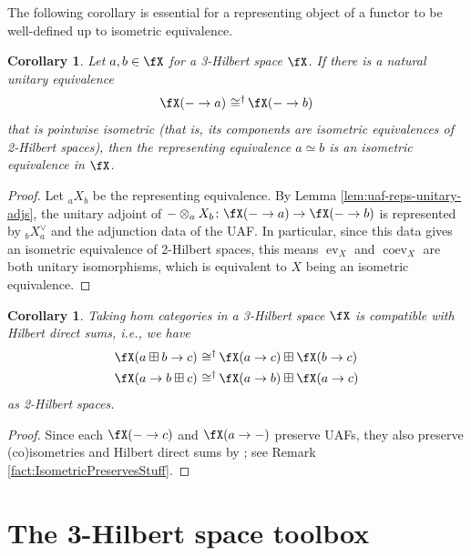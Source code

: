 \documentclass[12pt, reqno]{amsart}
\DeclareMathOperator{\coev}{coev}
\DeclareMathOperator{\ev}{ev}
\theoremstyle{plain}
\newtheorem{cor}[thm]{Corollary}
\theoremstyle{definition}
\DeclareMathOperator{\isomeq}{\mathbin{\,\cong^\dag}}
\begin{document}
The following corollary is essential for a representing object of a functor to be well-defined up to isometric equivalence.

\begin{cor}\label{cor:isometric-yoneda}
Let $a,b \in \fX$ for a 3-Hilbert space $\fX$. 
If there is a natural unitary equivalence 
$$\fX(-\to a) \isomeq \fX(-\to b)$$
that is pointwise isometric (that is, its components are isometric equivalences of 2-Hilbert spaces), then the representing equivalence $a \simeq b$ is an isometric equivalence in $\fX$.
\end{cor}
\begin{proof}
Let ${}_aX_b$ be the representing equivalence. 
By Lemma \ref{lem:uaf-reps-unitary-adjs}, the unitary adjoint of $- \otimes_a X _b \colon \fX(-\to a) \to \fX(-\to b)$ is represented by ${}_bX^\vee_a$ and the adjunction data of the UAF. 
In particular, since this data gives an isometric equivalence of 2-Hilbert spaces, this means $\ev_X$ and $\coev_X$ are both unitary isomorphisms, which is equivalent to $X$ being an isometric equivalence.
\end{proof}

\begin{cor}
\label{cor:YonedaLinear}
Taking hom categories in a 3-Hilbert space $\fX$ is compatible with Hilbert direct sums, i.e., we have
\begin{align*}
\fX(a\boxplus b\to c)
&\isomeq
\fX(a\to c)\boxplus \fX(b\to c)
\\
\fX(a\to b\boxplus c)
&\isomeq
\fX(a\to b)\boxplus \fX(a\to c)
\end{align*}
as 2-Hilbert spaces.
\end{cor}
\begin{proof}
Since each $\fX(-\to c)$ and $\fX(a\to -)$ preserve UAFs, they also preserve (co)isometries and Hilbert direct sums by \cite[Lem.~4.23]{MR5078555}; see Remark \ref{fact:IsometricPreservesStuff}.
\end{proof}

\section{The 3-Hilbert space toolbox}
\end{document}
